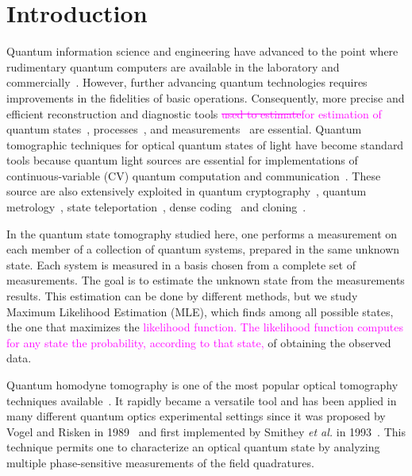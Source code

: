 \documentclass[
reprint,
superscriptaddress,
showpacs,
amsmath,
amssymb,
aps,
pra,
longbibliography
]{revtex4-1}
\providecommand{\aucmnt}[1]{#1}
\providecommand{\editcolor}[2]{\textcolor{#1}{#2}}
\providecommand{\aucmnt}[1]{}
\providecommand{\editcolor}[2]{#2}
\newcommand{\SG}[1]{\editcolor{magenta}{#1}}
\newcommand{\SGs}[1]{\aucmnt{\editcolor{magenta}{\sout{#1}}}}
\begin{document}

\section{Introduction}
\label{intro}
Quantum information science and engineering have advanced to the point
where rudimentary quantum computers are available in the laboratory
and commercially~\cite{kandala2017, Linke2017, Monk2017, Denchev2016}.
However, further advancing quantum technologies requires improvements
in the fidelities of basic operations.  Consequently, more precise and
efficient reconstruction and diagnostic tools \SGs{used to
  estimate}\SG{for estimation of} quantum
states~\cite{Vogel1989, Smithey1993, Dunn1995, Banaszek1999,
  Banaszek2000, White2002, Ourjoumtsev2007, Neergaard2006},
processes~\cite{Chuang1997, Poyatos1997, Altepeter2003, Dariano1998,
  Nielsen1998, Mitchell2003, Obrien2004,Kupchak2015}, and
measurements~\cite{Luis1999, Fiurasek2001, Dariano2004, Lundeen2009}
are essential. Quantum tomographic techniques for optical quantum
states of light have become standard tools because quantum light
sources are essential for implementations of continuous-variable (CV)
quantum computation and communication~\cite{Lloyd1999, Gottesman2001,
  Bartlett2002, Jeong2002, Ralph2003}.  These source are also
extensively exploited in quantum cryptography~\cite{Ralph1999,
  Hillery2000, Silberhorn2002, Pirandola2008, Luiz2017}, quantum
metrology~\cite{Eberle2010, Demkowicz2013}, state
teleportation~\cite{Vaidman1994, Braunstein1998, He2015}, dense
coding~\cite{Braunstein2000, Lee2014} and cloning~\cite{Cerf2000,
  Braunstein2001}.

In the quantum state tomography studied here, one performs a
measurement on each member of a collection of quantum systems,
prepared in the same unknown state. Each system is measured in a basis
chosen from a complete set of measurements. The goal is to estimate
the unknown state from the measurements results.  This estimation can
be done by different methods, but we study Maximum Likelihood
Estimation (MLE), which finds among all possible states, the one that
maximizes the \SG{likelihood function.  The likelihood function
  computes for any state the probability, according to that state,} of
obtaining the observed data.

Quantum homodyne tomography is one of the most popular optical
tomography techniques available~\cite{Lvovsky2004}. It rapidly became
a versatile tool and has been applied in many different quantum optics
experimental settings since it was proposed by Vogel and Risken in
1989~\cite{Vogel1989} and first implemented by Smithey \textit{et al.}
in 1993~\cite{Smithey1993}. This technique permits one to characterize
an optical quantum state by analyzing multiple phase-sensitive
measurements of the field quadratures.
\end{document}

